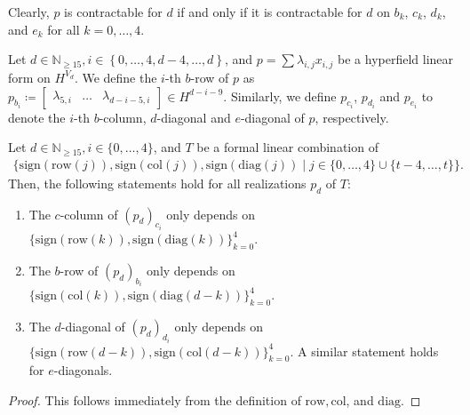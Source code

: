 \begin{remark}
    Clearly, \( p \) is contractable for \( d \) if and only if it is contractable for \( d \) on \( b_k \), \( c_k \), \( d_k \), and \( e_k \) for all \( k = 0, \dots, 4 \).
\end{remark}

\begin{definition}
    Let \( d \in \mathbb{N}_{\geq 15} , i \in \left\{ 0,\dots,4,d-4, \dots, d \right\}\), and $p = \sum \lambda_{i,j} x_{i,j}$ be a hyperfield linear form on \( H^{V_d} \). We define the $i$-th $b$-row of $p$ as \( p_{b_{i}} \coloneqq \begin{bmatrix} \lambda_{5,i} & \dots & \lambda_{d-i-5,i} \end{bmatrix} \in H^{d -  i - 9} \). Similarly, we define $p_{c_{i}}$, $p_{d_{i}}$ and $p_{e_{i}}$ to denote the $i$-th $b$-column, $d$-diagonal and $e$-diagonal of $p$, respectively.
  \end{definition}


\begin{proposition}\label{prop:nwfiewnfiuwneufni2un2}
    Let \( d \in \mathbb{N}_{\geq 15} , i \in \{ 0, \dots, 4 \} \), and $T$ be a formal linear combination of
    \begin{align*}
        \{ \mathrm{sign}(\mathrm{row}(j)), \mathrm{sign}(\mathrm{col}(j)), \mathrm{sign}(\mathrm{diag}(j)) \mid j \in \{ 0, \dots, 4\} \cup \{ t-4, \dots, t \} \}.
    \end{align*}
Then, the following statements hold for all realizations \( p_d \) of \( T \):
  \begin{enumerate}
  \item The $c$-column of $(p_d)_{c_i}$ only depends on $\{ \mathrm{sign}(\mathrm{row}(k)), \mathrm{sign}(\mathrm{diag}(k)) \}_{k = 0}^4$.
  \item The $b$-row of $(p_d)_{b_i}$ only depends on $\{ \mathrm{sign}(\mathrm{col}(k)), \mathrm{sign}(\mathrm{diag}(d-k)) \}_{k = 0}^4$.
  \item The $d$-diagonal of $(p_d)_{d_i}$ only depends on \(\{ \mathrm{sign}(\mathrm{row}(d-k)), \mathrm{sign}(\mathrm{col}(d-k)) \}_{k = 0}^4 \). A similar statement holds for $e$-diagonals.
  \end{enumerate}
  \end{proposition}
  
  \begin{proof}
   This follows immediately from the definition of $\mathrm{row}, \mathrm{col}$, and $\mathrm{diag}$.
  \end{proof}

